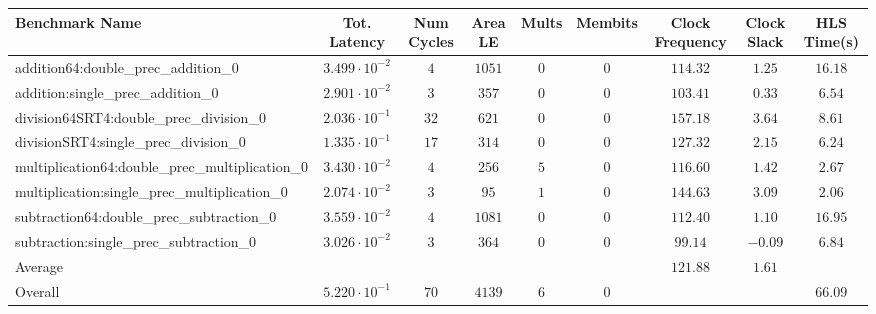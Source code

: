 \begin{tabular}{|l|c|c|c|c|c|c|c|c|}
\hline
Benchmark Name                                   & Tot. Latency            & Num Cycles & Area LE  & Mults & Membits & Clock Frequency & Clock Slack & HLS Time(s) \\
\hline
addition64:double\_prec\_addition\_0             & $ 3.499 \cdot 10^{-2} $ & $ 4      $ & $ 1051 $ & $ 0 $ & $ 0   $ & $ 114.32      $ & $ 1.25    $ & $ 16.18   $ \\
addition:single\_prec\_addition\_0               & $ 2.901 \cdot 10^{-2} $ & $ 3      $ & $ 357  $ & $ 0 $ & $ 0   $ & $ 103.41      $ & $ 0.33    $ & $ 6.54    $ \\
division64SRT4:double\_prec\_division\_0         & $ 2.036 \cdot 10^{-1} $ & $ 32     $ & $ 621  $ & $ 0 $ & $ 0   $ & $ 157.18      $ & $ 3.64    $ & $ 8.61    $ \\
divisionSRT4:single\_prec\_division\_0           & $ 1.335 \cdot 10^{-1} $ & $ 17     $ & $ 314  $ & $ 0 $ & $ 0   $ & $ 127.32      $ & $ 2.15    $ & $ 6.24    $ \\
multiplication64:double\_prec\_multiplication\_0 & $ 3.430 \cdot 10^{-2} $ & $ 4      $ & $ 256  $ & $ 5 $ & $ 0   $ & $ 116.60      $ & $ 1.42    $ & $ 2.67    $ \\
multiplication:single\_prec\_multiplication\_0   & $ 2.074 \cdot 10^{-2} $ & $ 3      $ & $ 95   $ & $ 1 $ & $ 0   $ & $ 144.63      $ & $ 3.09    $ & $ 2.06    $ \\
subtraction64:double\_prec\_subtraction\_0       & $ 3.559 \cdot 10^{-2} $ & $ 4      $ & $ 1081 $ & $ 0 $ & $ 0   $ & $ 112.40      $ & $ 1.10    $ & $ 16.95   $ \\
subtraction:single\_prec\_subtraction\_0         & $ 3.026 \cdot 10^{-2} $ & $ 3      $ & $ 364  $ & $ 0 $ & $ 0   $ & $ 99.14       $ & $ -0.09   $ & $ 6.84    $ \\
\hline
Average                                          & $                     $ & $        $ & $      $ & $   $ & $     $ & $ 121.88      $ & $ 1.61    $ & $         $ \\
\hline
Overall                                          & $ 5.220 \cdot 10^{-1} $ & $ 70     $ & $ 4139 $ & $ 6 $ & $ 0   $ & $             $ & $         $ & $ 66.09   $ \\
\hline
\end{tabular}
